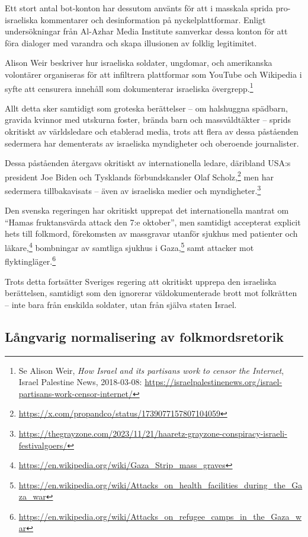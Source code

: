 Ett stort antal bot-konton har dessutom använts för att i masskala sprida pro-israeliska kommentarer och desinformation på nyckelplattformar. Enligt undersökningar från Al-Azhar Media Institute samverkar dessa konton för att föra dialoger med varandra och skapa illusionen av folklig legitimitet.

Alison Weir beskriver hur israeliska soldater, ungdomar, och amerikanska volontärer organiseras för att infiltrera plattformar som YouTube och Wikipedia i syfte att censurera innehåll som dokumenterar israeliska övergrepp.\footnote{Se Alison Weir, \textit{How Israel and its partisans work to censor the Internet}, Israel Palestine News, 2018-03-08: \url{https://israelpalestinenews.org/israel-partisans-work-censor-internet/}}


Allt detta sker samtidigt som groteska berättelser – om halshuggna spädbarn, gravida kvinnor med utskurna foster, brända barn och massvåldtäkter – sprids okritiskt av världsledare och etablerad media, trots att flera av dessa påståenden sedermera har dementerats av israeliska myndigheter och oberoende journalister.

Dessa påståenden återgavs okritiskt av internationella ledare, däribland USA:s president Joe Biden och Tysklands förbundskansler Olaf Scholz,\footnote{\url{https://x.com/propandco/status/1739077157807104059}} men har sedermera tillbakavisats – även av israeliska medier och myndigheter.\footnote{\url{https://thegrayzone.com/2023/11/21/haaretz-grayzone-conspiracy-israeli-festivalgoers/}}

Den svenska regeringen har okritiskt upprepat det internationella mantrat om \enquote{Hamas fruktansvärda attack den 7:e oktober}, men samtidigt accepterat explicit hets till folkmord, förekomsten av massgravar utanför sjukhus med patienter och läkare,\footnote{\url{https://en.wikipedia.org/wiki/Gaza_Strip_mass_graves}} bombningar av samtliga sjukhus i Gaza,\footnote{\url{https://en.wikipedia.org/wiki/Attacks_on_health_facilities_during_the_Gaza_war}} samt attacker mot flyktingläger.\footnote{\url{https://en.wikipedia.org/wiki/Attacks_on_refugee_camps_in_the_Gaza_war}}

Trots detta fortsätter Sveriges regering att okritiskt upprepa den israeliska berättelsen, samtidigt som den ignorerar väldokumenterade brott mot folkrätten – inte bara från enskilda soldater, utan från själva staten Israel.


\subsection{Långvarig normalisering av folkmordsretorik}

